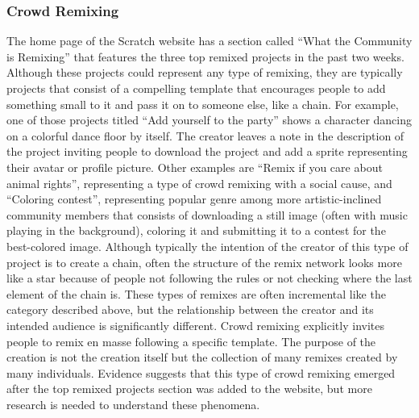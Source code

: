 \subsubsection{Crowd Remixing}
The home page of the Scratch website has a section called ``What the Community is Remixing''  that features the three top remixed projects in the past two weeks.
Although these projects could represent any type of remixing, they are typically projects that consist of a compelling template that encourages people to add something small to it and pass it on to someone else, like a chain.
For example, one of those projects titled ``Add yourself to the party'' shows a character dancing on a colorful dance floor by itself.
The creator leaves a note in the description of the project inviting people to download the project and add a sprite representing their avatar or profile picture.
Other examples are ``Remix if you care about animal rights'', representing a type of crowd remixing with a social cause, and ``Coloring contest'', representing popular genre among more artistic-inclined community members that consists of downloading a still image (often with music playing in the background), coloring it and submitting it to a contest for the best-colored image.
Although typically the intention of the creator of this type of project is to create a chain, often the structure of the remix network looks more like a star because of people not following the rules or not checking where the last element of the chain is.
These types of remixes are often incremental like the category described above, but the relationship between the creator and its intended audience is significantly different. 
Crowd remixing explicitly invites people to remix en masse following a specific template. 
The purpose of the creation is not the creation itself but the collection of many remixes created by many individuals.
Evidence suggests that this type of crowd remixing emerged after the top remixed projects section was added to the website, but more research is needed to understand these phenomena.

